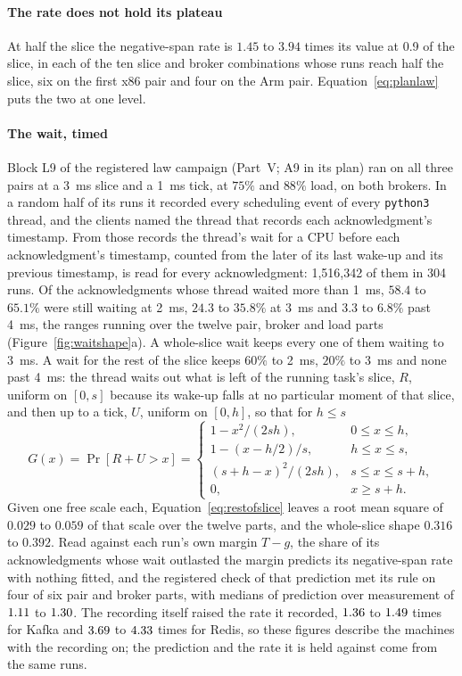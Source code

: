 \documentclass[10pt,journal,onecolumn]{IEEEtran}
\newcommand{\kafka}{Kafka}
\newcommand{\redis}{Redis}
\begin{document}
\paragraph{The rate does not hold its plateau} At half the slice the negative-span rate is
$1.45$ to $3.94$ times its value at 0.9 of the slice, in each of the ten slice and broker
combinations whose runs reach half the slice, six on the first x86 pair and four on the Arm
pair. Equation~\ref{eq:planlaw} puts the two at one level.

\paragraph{The wait, timed} Block L9 of the registered law campaign (Part~V; A9 in its plan)
ran on all three pairs at a 3~ms slice and a 1~ms
tick, at $75\%$ and $88\%$ load, on both brokers. In a random half of its runs it recorded every
scheduling event of every \texttt{python3} thread, and the clients named the thread that records
each acknowledgment's timestamp. From those records the thread's wait for a CPU before each
acknowledgment's timestamp, counted from the later of its last wake-up and its previous
timestamp, is read for every acknowledgment: 1,516,342 of them in 304 runs. Of the acknowledgments
whose thread waited more than 1~ms, $58.4$ to $65.1\%$ were still waiting at 2~ms, $24.3$ to
$35.8\%$ at 3~ms and $3.3$ to $6.8\%$ past 4~ms, the ranges running over the twelve pair, broker
and load parts (Figure~\ref{fig:waitshape}a). A whole-slice wait keeps every one of them waiting
to 3~ms. A wait for the rest of the slice keeps $60\%$ to 2~ms, $20\%$ to 3~ms and none past
4~ms: the thread waits out what is left of the running task's slice, $R$, uniform on $[0, s]$
because its wake-up falls at no particular moment of that slice, and then up to a tick, $U$,
uniform on $[0, h]$, so that for $h \le s$
\begin{equation}
\label{eq:restofslice}
G(x) = \Pr[R + U > x] = \begin{cases} 1 - x^2/(2sh), & 0 \le x \le h,\\ 1 - (x - h/2)/s, & h \le x \le s,\\ (s + h - x)^2/(2sh), & s \le x \le s + h,\\ 0, & x \ge s + h. \end{cases}
\end{equation}
Given one free scale each, Equation~\ref{eq:restofslice} leaves a root mean square of $0.029$ to
$0.059$ of that scale over the twelve parts, and the whole-slice shape $0.316$ to $0.392$.
Read against each run's own margin $T - g$, the share of its acknowledgments whose wait
outlasted the margin predicts its negative-span rate with nothing fitted, and the registered
check of that prediction met its rule on four of six pair and broker parts, with medians of
prediction over measurement of $1.11$ to $1.30$. The recording itself raised the rate it
recorded, $1.36$ to $1.49$ times for \kafka{} and $3.69$ to $4.33$ times for \redis{}, so these
figures describe the machines with the recording on; the prediction and the rate it is held
against come from the same runs.
\end{document}
